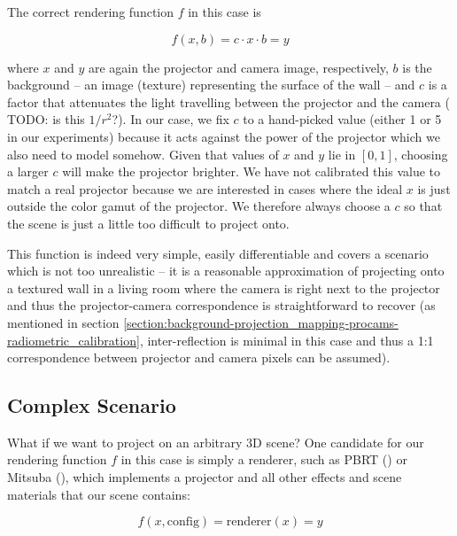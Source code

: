 The correct rendering function \(f\) in this case is

\begin{equation}
    \label{eq:rendering_function-simple}
    f(x, b) = c \cdot x \cdot b = y
\end{equation}

where \(x\) and \(y\) are again the projector and camera image, respectively, \(b\) is the background -- an image (texture) representing the surface of the wall -- and \(c\) is a factor that attenuates the light travelling between the projector and the camera ({\color{red} TODO: is this \(1/r^2\)?}). In our case, we fix \(c\) to a hand-picked value (either 1 or 5 in our experiments) because it acts against the power of the projector which we also need to model somehow. Given that values of \(x\) and \(y\) lie in \([0, 1]\), choosing a larger \(c\) will make the projector brighter. We have not calibrated this value to match a real projector because we are interested in cases where the ideal \(x\) is just outside the color gamut of the projector. We therefore always choose a \(c\) so that the scene is just a little too difficult to project onto.

This function is indeed very simple, easily differentiable and covers a scenario which is not too unrealistic -- it is a reasonable approximation of projecting onto a textured wall in a living room where the camera is right next to the projector and thus the projector-camera correspondence is straightforward to recover (as mentioned in section \ref{section:background-projection_mapping-procams-radiometric_calibration}, inter-reflection is minimal in this case and thus a 1:1 correspondence between projector and camera pixels can be assumed).

\subsection{Complex Scenario}
\label{section:methods-rendering_function-complex}

What if we want to project on an arbitrary 3D scene? One candidate for our rendering function \(f\) in this case is simply a renderer, such as PBRT (\citet{PBRT3e}) or Mitsuba (\citet{Mitsuba}), which implements a projector and all other effects and scene materials that our scene contains:

\begin{equation}
    \label{eq:rendering_function-renderer}
    f(x, \text{config}) = \text{renderer}(x) = y
\end{equation}

